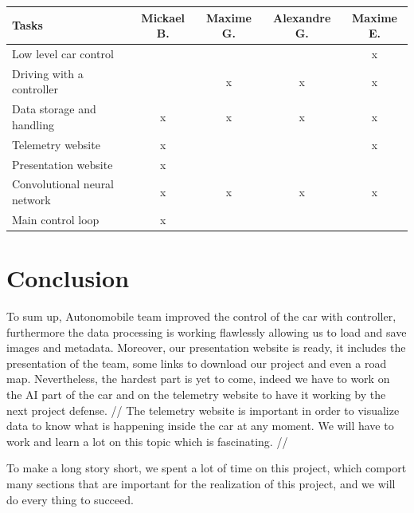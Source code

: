 \documentclass[12pt]{article}
\begin{document}
\begin{tabular}{|l|c|c|c|c|} 
\hline
Tasks                        & Mickael B. & Maxime G. & Alexandre G. & Maxime E.  \\ 
\hline
Low level car control        &            &           &              & x          \\ 
\hline
Driving with a controller    &            & x         & x            & x          \\ 
\hline
Data storage and handling    & x          & x         & x            & x          \\ 
\hline
Telemetry website            & x          &           &              & x          \\ 
\hline
Presentation website         & x          &           &              &            \\ 
\hline
Convolutional neural network & x          & x         & x            & x          \\ 
\hline
Main control loop            & x          &           &              &            \\
\hline
\end{tabular}

\section {Conclusion}
To sum up, Autonomobile team improved the control of the car with controller, furthermore the data processing is working flawlessly allowing us to load and save images and metadata. Moreover, our presentation website is ready, it includes the presentation of the team, some links to download our project and even a road map. Nevertheless, the hardest part is yet to come, indeed we have to work on the AI part of the car and on the telemetry website to have it working by the next project defense. //
The telemetry website is important in order to visualize data to know what is happening inside the car at any moment. We will have to work and learn a lot on this topic which is fascinating. //

To make a long story short, we spent a lot of time on this project, which comport many sections that are important for the realization of this project, and we will do every thing to succeed. 
\end{document}
